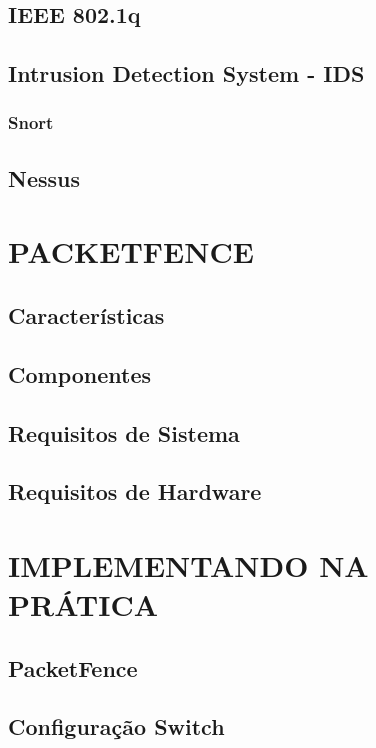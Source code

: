 \documentclass[12pt, brazil, ruledheader, pnumromarab,normaltoc]{abnt}
\begin{document}
\section{IEEE 802.1q}

\section{Intrusion Detection System - IDS}
\subsection{Snort}

\section{Nessus}


\chapter{PACKETFENCE}

\section{Características}

\section{Componentes}

\section{Requisitos de Sistema}

\section{Requisitos de Hardware}


\chapter{IMPLEMENTANDO NA PRÁTICA}

\section{PacketFence}

\section{Configuração Switch}
\end{document}
